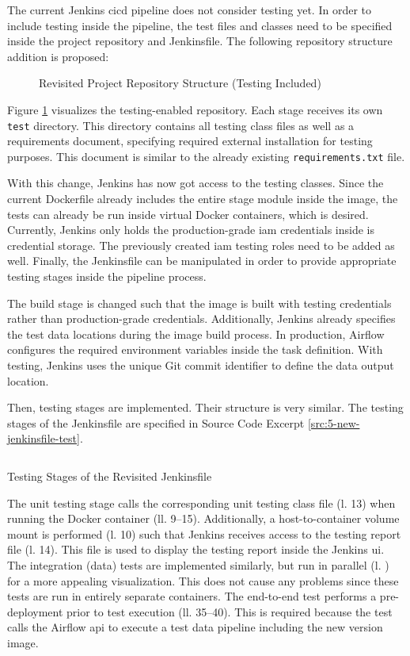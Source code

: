 The current Jenkins \ac{cicd} pipeline does not consider testing yet. In order to include testing inside the pipeline, the test files and classes need to be specified inside the project repository and Jenkinsfile. The following repository structure addition is proposed:

\begin{figure}[h!]
	\centering
	\caption{Revisited Project Repository Structure (Testing Included)}
	\label{fig:5-new-repo}
\end{figure}

Figure \ref{fig:5-new-repo} visualizes the testing-enabled repository. Each stage receives its own \texttt{test} directory. This directory contains all testing class files as well as a requirements document, specifying required external installation for testing purposes. This document is similar to the already existing \texttt{requirements.txt} file.

With this change, Jenkins has now got access to the testing classes. Since the current Dockerfile already includes the entire stage module inside the image, the tests can already be run inside virtual Docker containers, which is desired. Currently, Jenkins only holds the production-grade \ac{iam} credentials inside is credential storage. The previously created \ac{iam} testing roles need to be added as well. Finally, the Jenkinsfile can be manipulated in order to provide appropriate testing stages inside the pipeline process.

The build stage is changed such that the image is built with testing credentials rather than production-grade credentials. Additionally, Jenkins already specifies the test data locations during the image build process. In production, Airflow configures the required environment variables inside the task definition. With testing, Jenkins uses the unique Git commit identifier to define the data output location.

Then, testing stages are implemented. Their structure is very similar. The testing stages of the Jenkinsfile are specified in Source Code Excerpt \ref{src:5-new-jenkinsfile-test}.

\begin{listing}[h!]
	\inputminted{groovy}{main-matter/src/5-new-jenkinsfile-test}
	\caption{Testing Stages of the Revisited Jenkinsfile}
	\label{src:5-new-jenkinsfile-test}
\end{listing}

The unit testing stage calls the corresponding unit testing class file (l. 13) when running the Docker container (ll. 9--15). Additionally, a host-to-container volume mount is performed (l. 10) such that Jenkins receives access to the testing report file (l. 14). This file is used to display the testing report inside the Jenkins \ac{ui}. The integration (data) tests are implemented similarly, but run in parallel (l. ) for a more appealing visualization. This does not cause any problems since these tests are run in entirely separate containers. The end-to-end test performs a pre-deployment prior to test execution (ll. 35--40). This is required because the test calls the Airflow \acs{api} to execute a test data pipeline including the new version image. 

